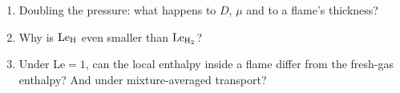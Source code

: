 \begin{selfcheck}
\begin{enumerate}
  \item Doubling the pressure: what happens to $D$, $\mu$ and to a flame's thickness?
  \item Why is $\mathrm{Le}_{\rm H}$ even smaller than $\mathrm{Le}_{\mathrm{H_2}}$?
  \item Under $\mathrm{Le}=1$, can the local enthalpy inside a flame differ from the fresh-gas
        enthalpy? And under mixture-averaged transport?
\end{enumerate}
\end{selfcheck}
